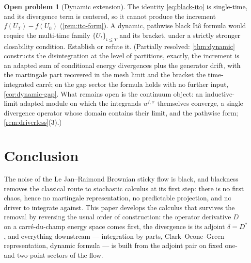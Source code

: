 \documentclass[reqno,final,11pt]{amsart}
\theoremstyle{plain}
\theoremstyle{definition}
\newtheorem{problem}[theorem]{Open problem}
\theoremstyle{remark}
\begin{document}
\begin{problem}[Dynamic extension]\label{prob:multitime}
The identity \eqref{eq:black-ito} is single-time, and its divergence term is
centered, so it cannot produce the increment $f(U_T)-f(U_0)$
(\cref{rem:ito-form}). A dynamic, pathwise black It\^o formula would require the
multi-time family $\{U_t\}_{t\le T}$ and its bracket, under a strictly stronger
closability condition. Establish or refute it. (Partially resolved:
\cref{thm:dynamic} constructs the disintegration at the level of partitions,
exactly, the increment is an adapted sum of conditional energy divergences
plus the generator drift, with the martingale part recovered in the mesh
limit and the bracket the time-integrated carr\'e; on the gap sector the
formula holds with no further input, \cref{cor:dynamic-gap}. What remains open is the
continuum object: an inductive-limit adapted module on which the integrands
$u^{f,\pi}$ themselves converge, a single divergence operator whose domain
contains their limit, and the pathwise form; \cref{rem:driverless}(3).)
\end{problem}

\section{Conclusion}\label{sec:conclusion}

The noise of the Le Jan--Raimond Brownian sticky flow is black, and
blackness removes the classical route to stochastic calculus at its first
step: there is no first chaos, hence no martingale representation, no
predictable projection, and no driver to integrate against. This paper
develops the calculus that survives the removal by reversing the usual
order of construction: the operator derivative $D$ on a carr\'e-du-champ
energy space comes first, the divergence is its adjoint $\delta=D^{*}$,
and everything downstream --- integration by parts, Clark--Ocone--Green
representation, dynamic formula --- is built from the adjoint pair on
fixed one- and two-point sectors of the flow.
\end{document}
